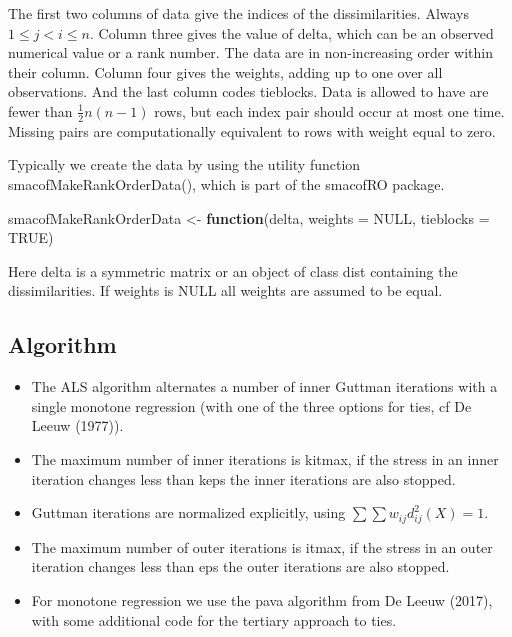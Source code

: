 \documentclass[
  12pt,
]{article}
\newenvironment{Shaded}{\begin{snugshade}}{\end{snugshade}}
\newcommand{\AttributeTok}[1]{\textcolor[rgb]{0.13,0.29,0.53}{#1}}
\newcommand{\ConstantTok}[1]{\textcolor[rgb]{0.56,0.35,0.01}{#1}}
\newcommand{\ControlFlowTok}[1]{\textcolor[rgb]{0.13,0.29,0.53}{\textbf{#1}}}
\newcommand{\NormalTok}[1]{#1}
\newcommand{\OtherTok}[1]{\textcolor[rgb]{0.56,0.35,0.01}{#1}}
\providecommand{\tightlist}{%
  \setlength{\itemsep}{0pt}\setlength{\parskip}{0pt}}
\begin{document}
The first two columns of data give the indices of the dissimilarities. Always \(1\leq j<i\leq n\).
Column three gives the value of delta, which can be an observed numerical value or
a rank number. The data are in non-increasing order within their
column. Column four gives the weights, adding up to one over all observations.
And the last column codes tieblocks. Data is allowed to have are fewer than \(\frac12n(n-1)\) rows,
but each index pair should occur at most one time.
Missing pairs are computationally equivalent to rows with weight equal to zero.

Typically we create the data by using the utility function smacofMakeRankOrderData(), which is part of the
smacofRO package.

\begin{Shaded}
\begin{Highlighting}[]
\NormalTok{smacofMakeRankOrderData }\OtherTok{\textless{}{-}}
  \ControlFlowTok{function}\NormalTok{(delta, }\AttributeTok{weights =} \ConstantTok{NULL}\NormalTok{, }\AttributeTok{tieblocks =} \ConstantTok{TRUE}\NormalTok{)}
\end{Highlighting}
\end{Shaded}

Here delta is a symmetric matrix or an object of class dist containing the dissimilarities.
If weights is NULL all weights are assumed to be equal.

\subsection{Algorithm}\label{algorithm}

\begin{itemize}
\tightlist
\item
  The ALS algorithm alternates a number of inner Guttman iterations with a single monotone
  regression (with one of the three options for ties, cf De Leeuw (1977)).
\item
  The maximum number of inner iterations is kitmax, if the stress in an
  inner iteration changes less than keps the inner iterations are also stopped.
\item
  Guttman iterations are normalized explicitly, using \(\sum\sum w_{ij}d_{ij}^2(X)=1\).
\item
  The maximum number of outer iterations is itmax, if the stress in an
  outer iteration changes less than eps the outer iterations are also stopped.
\item
  For monotone regression we use the pava algorithm from De Leeuw (2017), with
  some additional code for the tertiary approach to ties.
\end{itemize}
\end{document}
